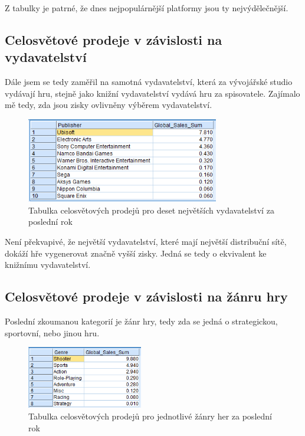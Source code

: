 \documentclass[FM,ZP]{tulthesis}
\begin{document}
Z tabulky je patrné, že dnes nejpopulárnější platformy jsou ty nejvýdělečnější. 

\subsection{Celosvětové prodeje v závislosti na vydavatelství}
Dále jsem se tedy zaměřil na samotná vydavatelství, která za vývojářské studio vydávají hru, stejně jako knižní vydavatelství vydává hru za spisovatele. Zajímalo mě tedy, zda jsou zisky ovlivněny výběrem vydavatelství.

\begin{figure}[H]
\begin{center}
\includegraphics[width=0.75\textwidth]{images/publisherSales.png}
\caption{Tabulka celosvětových prodejů pro deset největších vydavatelství za poslední rok}
\label{image}
\end{center}
\end{figure}

Není překvapivé, že největší vydavatelství, které mají největší distribuční sítě, dokáží hře vygenerovat značně vyšší zisky. Jedná se tedy o ekvivalent ke knižnímu vydavatelství.

\subsection{Celosvětové prodeje v závislosti na žánru hry}
Poslední zkoumanou kategorií je žánr hry, tedy zda se jedná o strategickou, sportovní, nebo jinou hru.

\begin{figure}[H]
\begin{center}
\includegraphics[width=0.45\textwidth]{images/genreSales.png}
\caption{Tabulka celosvětových prodejů pro jednotlivé žánry her za poslední rok}
\label{image}
\end{center}
\end{figure}
\end{document}
